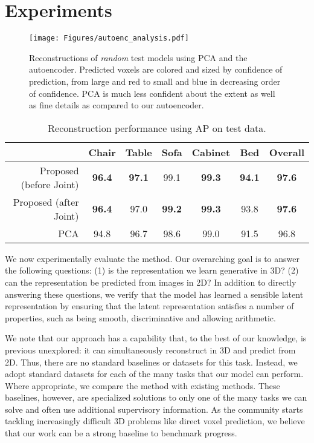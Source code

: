 \documentclass[runningheads]{llncs}
\begin{document}
\section{Experiments}\begin{figure}[t]
\texttt{[image: Figures/autoenc\_analysis.pdf]}
\caption{Reconstructions of {\it random} test models using PCA and the autoencoder.
Predicted voxels are colored and sized by confidence of prediction, 
from large and red to small and blue in decreasing order of confidence.
PCA is much less confident about the extent as well as fine details
as compared to our autoencoder.}
\label{fig:reconstruction}
\end{figure}\begin{table}[t]
\centering
\caption{Reconstruction performance using AP on test data.}
\label{tab:reconstruction}
\begin{tabular}{r@{~~~}ccccc@{~~~}c} \toprule
                          & Chair         & Table         & Sofa          & Cabinet       & Bed           & Overall \\ \midrule
Proposed (before Joint)   & \bf 96.4    & \bf 97.1    & 99.1    & \bf 99.3    & \bf 94.1    & \bf 97.6    \\
Proposed (after Joint)    & \bf 96.4    & 97.0    & \bf 99.2    & \bf 99.3    & 93.8    & \bf 97.6    \\
PCA                       & 94.8        & 96.7        & 98.6        & 99.0        & 91.5        & 96.8 \\ \bottomrule

\end{tabular}
\end{table}We now experimentally evaluate the method. 
Our overarching goal is to answer the following questions: (1) is the
representation we learn generative in 3D? (2) can the representation be
predicted from images in 2D? In addition to directly answering these questions,
we verify that the 
model has learned a sensible latent representation by ensuring
that the latent representation satisfies a number of properties, such as
being smooth, discriminative and allowing arithmetic.

We note that our approach
has a capability that, to the best of our knowledge, is previous unexplored: it can
simultaneously reconstruct in 3D and predict from 2D. Thus, there are no standard baselines or
datasets for this task. Instead, we adopt standard datasets for each of the many tasks
that our model can perform. Where appropriate, we compare the method with existing methods.
These baselines, however, are specialized solutions to only one of the many tasks we can solve
and often use additional supervisory information.
As the community starts tackling increasingly difficult 3D problems like direct voxel
prediction, we believe that our work can be a strong baseline to benchmark progress.
\end{document}
